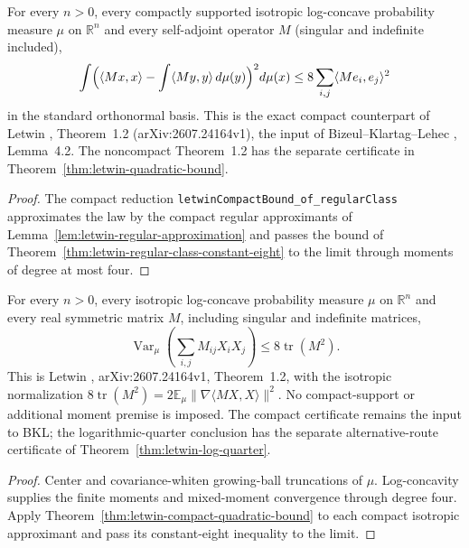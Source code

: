 \begin{theorem}
  \label{thm:letwin-compact-quadratic-bound}
  \leanok
  For every $n>0$, every compactly supported isotropic log-concave probability measure $\mu$ on $\mathbb R^n$ and every
  self-adjoint operator $M$ (singular and indefinite included),
  \[
    \int\Bigl(\langle Mx,x\rangle-\int\langle My,y\rangle\,d\mu(y)\Bigr)^2d\mu(x)\le8\sum_{i,j}\langle Me_i,e_j\rangle^2
  \]
  in the standard orthonormal basis. This is the exact compact counterpart of Letwin \cite{Letwin2026QuadraticKLS},
  Theorem~1.2 (arXiv:2607.24164v1), the input of Bizeul--Klartag--Lehec \cite{BizeulKlartagLehec2026}, Lemma~4.2. The
  noncompact Theorem~1.2 has the separate certificate in Theorem~\ref{thm:letwin-quadratic-bound}.
\end{theorem}
\begin{proof}
  \leanok
  The compact reduction \texttt{letwinCompactBound\_of\_regularClass} approximates the law by the compact regular
  approximants of Lemma~\ref{lem:letwin-regular-approximation} and passes the bound of
  Theorem~\ref{thm:letwin-regular-class-constant-eight} to the limit through moments of degree at most four.
\end{proof}

\begin{theorem}
  \label{thm:letwin-quadratic-bound}
  \leanok
  For every $n>0$, every isotropic log-concave probability measure $\mu$ on $\mathbb R^n$
  and every real symmetric matrix $M$, including singular and indefinite matrices,
  \[
    \operatorname{Var}_\mu\!\left(\sum_{i,j}M_{ij}X_iX_j\right)
      \le 8\operatorname{tr}(M^2).
  \]
  This is Letwin \cite{Letwin2026QuadraticKLS}, arXiv:2607.24164v1, Theorem~1.2,
  with the isotropic normalization $8\operatorname{tr}(M^2)
  =2\mathbb E_\mu\|\nabla\langle MX,X\rangle\|^2$.
  No compact-support or additional moment premise is imposed. The compact certificate
  remains the input to BKL; the logarithmic-quarter conclusion has the separate
  alternative-route certificate of Theorem~\ref{thm:letwin-log-quarter}.
\end{theorem}
\begin{proof}
  \leanok
  Center and covariance-whiten growing-ball truncations of $\mu$. Log-concavity supplies
  the finite moments and mixed-moment convergence through degree four. Apply
  Theorem~\ref{thm:letwin-compact-quadratic-bound} to each compact isotropic approximant
  and pass its constant-eight inequality to the limit.
\end{proof}

